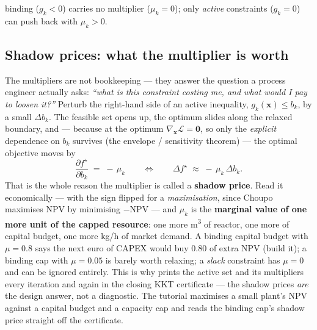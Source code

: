 \documentclass[11pt,a4paper]{article}
\newcommand{\xv}{\mathbf{x}}
\begin{document}
binding ($g_k < 0$) carries no multiplier ($\mu_k = 0$); only
\emph{active} constraints ($g_k = 0$) can push back with $\mu_k > 0$.

\subsection{Shadow prices: what the multiplier is worth}\label{sec:sqp-shadow}

The multipliers are not bookkeeping --- they answer the question a
process engineer actually asks: \emph{``what is this constraint costing
me, and what would I pay to loosen it?''}  Perturb the right-hand side
of an active inequality, $g_k(\xv)\le b_k$, by a small $\Delta b_k$.  The
feasible set opens up, the optimum slides along the relaxed boundary,
and --- because at the optimum $\nabla_{\!\xv}\mathcal L=\mathbf 0$, so
only the \emph{explicit} dependence on $b_k$ survives (the envelope /
sensitivity theorem) --- the optimal objective moves by
\begin{equation}
   \frac{\partial f^\star}{\partial b_k} \;=\; -\,\mu_k
   \qquad\Longleftrightarrow\qquad
   \Delta f^\star \;\approx\; -\,\mu_k\,\Delta b_k .
   \label{eq:sensitivity}
\end{equation}
That is the whole reason the multiplier is called a \textbf{shadow
price}.  Read it economically --- with the sign flipped for a
\emph{maximisation}, since Choupo maximises NPV by minimising $-$NPV ---
and $\mu_k$ is the \textbf{marginal \texteuro{} value of one more unit of the
capped resource}: one more m\textsuperscript{3} of reactor, one more
\texteuro{} of capital budget, one more kg/h of market demand.  A binding
capital budget with $\mu=0.8$ says the next euro of CAPEX would buy
\texteuro{}0.80 of extra NPV (build it); a binding cap with $\mu=0.05$ is
barely worth relaxing; a \emph{slack} constraint has $\mu=0$ and can be
ignored entirely.  This is why  prints the active set
and its multipliers every iteration and again in the closing KKT
certificate --- the shadow prices \emph{are} the design answer, not a
diagnostic.  The tutorial
maximises a small plant's NPV against a capital budget and a capacity
cap and reads the binding cap's shadow price straight off the
certificate.
\end{document}

